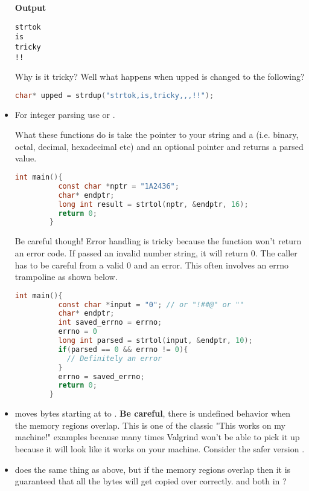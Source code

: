 \begin{itemize}
	      \textbf{Output}

	      \begin{lstlisting}[language=console]
strtok
is
tricky
!!
\end{lstlisting}

	      Why is it tricky? Well what happens when upped is changed to the following?

	      \begin{lstlisting}[language=C]
        char* upped = strdup("strtok,is,tricky,,,!!");
\end{lstlisting}

	\item For integer parsing use
	      or
	      .

	      What these functions do is take the pointer to your string
	       and a  (i.e. binary, octal, decimal,
	      hexadecimal etc) and an optional pointer  and returns a
	      parsed value.

	      \begin{lstlisting}[language=C]
        int main(){
          const char *nptr = "1A2436";
          char* endptr;
          long int result = strtol(nptr, &endptr, 16);
          return 0;
        }
\end{lstlisting}

	      Be careful though!
        Error handling is tricky because the function won't return an error code.
        If passed an invalid number string, it will return 0.
        The caller has to be careful from a valid 0 and an error.
        This often involves an errno trampoline as shown below.

	      \begin{lstlisting}[language=C]
        int main(){
          const char *input = "0"; // or "!##@" or ""
          char* endptr;
          int saved_errno = errno;
          errno = 0
          long int parsed = strtol(input, &endptr, 10);
          if(parsed == 0 && errno != 0){
            // Definitely an error
          }
          errno = saved_errno;
          return 0;
        }
\end{lstlisting}

	    \item {} moves  bytes starting at  to .
        \textbf{Be careful}, there is undefined behavior when the memory regions overlap.
        This is one of the classic "This works on my machine!" examples because many times Valgrind won't be able to pick it up because it will look like it works on your machine.
        Consider the safer version .

	    \item {} does the same thing as above, but if the memory regions overlap then it is guaranteed that all the bytes will get copied over correctly.
         and  both in ?
\end{itemize}


